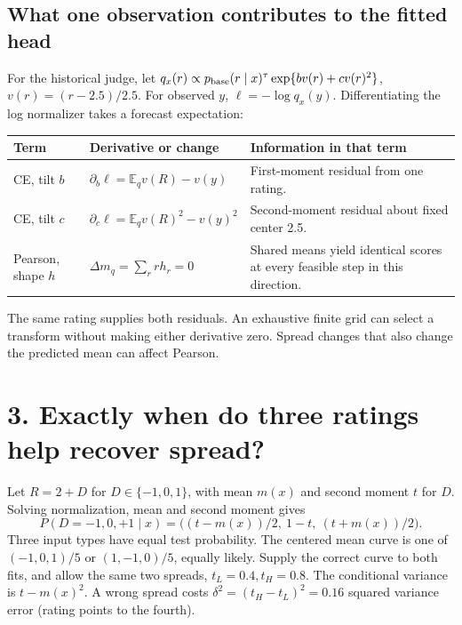 \documentclass[11pt]{article}
\newcommand{\E}{\mathbb E}\newcommand{\Var}{\operatorname{Var}}\newcommand{\Cov}{\operatorname{Cov}}
\begin{document}
\subsection*{What one observation contributes to the fitted head}
For the historical judge, let $q_x(r)\propto p_{\rm base}(r\mid x)^\tau
 \exp\{b v(r)+c v(r)^2\}$, $v(r)=(r-2.5)/2.5$. For observed $y$, $\ell=-\log q_x(y)$. Differentiating the log normalizer takes a forecast expectation:
\begin{center}\small
\begin{tabularx}{\linewidth}{@{}l l X@{}}\toprule
Term & Derivative or change & Information in that term\\ \midrule
CE, tilt $b$ & $\partial_b\ell=\E_q v(R)-v(y)$ & First-moment residual from one rating.\\
CE, tilt $c$ & $\partial_c\ell=\E_q v(R)^2-v(y)^2$ & Second-moment residual about fixed center 2.5.\\
Pearson, shape $h$ & $\Delta m_q=\sum_r r h_r=0$ & Shared means yield identical scores at every feasible step in this direction.\\ \bottomrule
\end{tabularx}
\end{center}
The same rating supplies both residuals. An exhaustive finite grid can select a transform without making either derivative zero. Spread changes that also change the predicted mean can affect Pearson.

\newpage
\section*{3. Exactly when do three ratings help recover spread?}
Let $R=2+D$ for $D\in\{-1,0,1\}$, with mean $m(x)$ and second moment $t$ for $D$. Solving normalization, mean and second moment gives
\[
P(D=-1,0,+1\mid x)=\big((t-m(x))/2,\ 1-t,\ (t+m(x))/2\big).
\]
Three input types have equal test probability. The centered mean curve is one of $(-1,0,1)/5$ or $(1,-1,0)/5$, equally likely. Supply the correct curve to both fits, and allow the same two spreads, $t_L=0.4,t_H=0.8$. The conditional variance is $t-m(x)^2$. A wrong spread costs $\delta^2=(t_H-t_L)^2=0.16$ squared variance error (rating points to the fourth).
\end{document}
